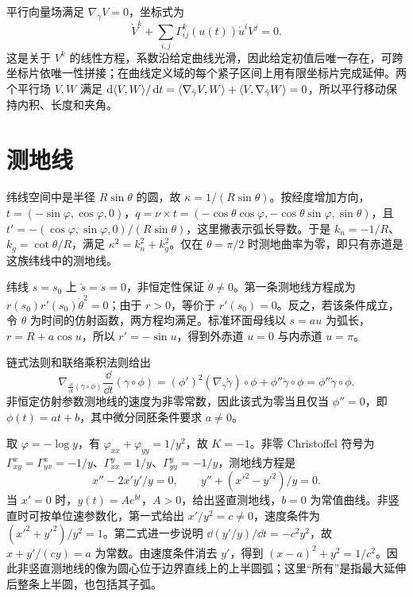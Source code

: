 \begin{solve}
平行向量场满足 $\nabla_{\dot\gamma}V=0$，坐标式为
\[
 \dot V^k+\sum_{i,j}\Gamma^k_{ij}(u(t))\dot u^iV^j=0.
\]
这是关于 $V^k$ 的线性方程，系数沿给定曲线光滑，因此给定初值后唯一存在，可跨坐标片依唯一性拼接；在曲线定义域的每个紧子区间上用有限坐标片完成延伸。两个平行场 $V,W$ 满足 $\mathop{}\!\mathrm d\langle V,W\rangle/\mathop{}\!\mathrm d t=\langle \nabla_{\dot\gamma}V,W\rangle+\langle V,\nabla_{\dot\gamma}W\rangle=0$，所以平行移动保持内积、长度和夹角。
\end{solve}

\section{测地线}
\begin{solve}
纬线空间中是半径 $R\sin\theta$ 的圆，故 $\kappa=1/(R\sin\theta)$。按经度增加方向，$t=(-\sin\varphi,\cos\varphi,0)$，$q=\nu\times t=(-\cos\theta\cos\varphi,-\cos\theta\sin\varphi,\sin\theta)$，且 $t'=-(\cos\varphi,\sin\varphi,0)/(R\sin\theta)$，这里撇表示弧长导数。于是 $k_n=-1/R$、$k_g=\cot\theta/R$，满足 $\kappa^2=k_n^2+k_g^2$。仅在 $\theta=\pi/2$ 时测地曲率为零，即只有赤道是这族纬线中的测地线。
\end{solve}

\begin{solve}
纬线 $s=s_0$ 上 $\dot s=\ddot s=0$，非恒定性保证 $\dot\theta\ne0$。第一条测地线方程成为 $r(s_0)r'(s_0)\dot\theta^2=0$；由于 $r>0$，等价于 $r'(s_0)=0$。反之，若该条件成立，令 $\theta$ 为时间的仿射函数，两方程均满足。标准环面母线以 $s=au$ 为弧长，$r=R+a\cos u$，所以 $r'= -\sin u$，得到外赤道 $u=0$ 与内赤道 $u=\pi$。
\end{solve}

\begin{solve}
链式法则和联络乘积法则给出
\[
 \nabla_{\frac{\dd}{\dd t}(\gamma\circ\phi)}
       \frac{\dd}{\dd t}(\gamma\circ\phi)
 =(\phi')^2(\nabla_{\dot\gamma}\dot\gamma)\circ\phi
 +\phi''\dot\gamma\circ\phi
 =\phi''\dot\gamma\circ\phi.
\]
非恒定仿射参数测地线的速度为非零常数，因此该式为零当且仅当 $\phi''=0$，即 $\phi(t)=at+b$，其中微分同胚条件要求 $a\ne0$。
\end{solve}

\begin{solve}
取 $\varphi=-\log y$，有 $\varphi_{xx}+\varphi_{yy}=1/y^2$，故 $K=-1$。非零 Christoffel 符号为 $\Gamma^x_{xy}=\Gamma^x_{yx}=-1/y$、$\Gamma^y_{xx}=1/y$、$\Gamma^y_{yy}=-1/y$，测地线方程是
\[
 x''-2x'y'/y=0,\qquad y''+(x'^2-y'^2)/y=0.
\]
当 $x'=0$ 时，$y(t)=Ae^{bt}$，$A>0$，给出竖直测地线，$b=0$ 为常值曲线。非竖直时可按单位速参数化，第一式给出 $x'/y^2=c\ne0$，速度条件为 $(x'^2+y'^2)/y^2=1$。第二式进一步说明 $\dd(y'/y)/\dd t=-c^2y^2$，故 $x+y'/(cy)=a$ 为常数。由速度条件消去 $y'$，得到 $(x-a)^2+y^2=1/c^2$。因此非竖直测地线的像为圆心位于边界直线上的上半圆弧；这里“所有”是指最大延伸后整条上半圆，也包括其子弧。
\end{solve}

